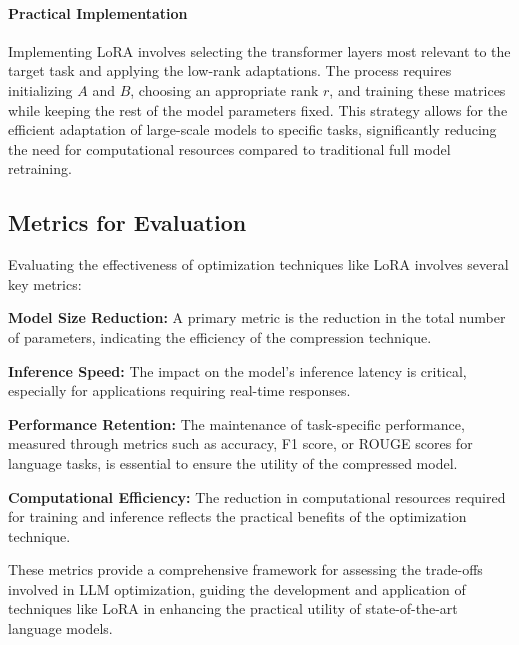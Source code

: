         \paragraph{Practical Implementation}
        Implementing LoRA involves selecting the transformer layers most relevant to the target task and applying the low-rank adaptations. The process requires initializing \(A\) and \(B\), choosing an appropriate rank \(r\), and training these matrices while keeping the rest of the model parameters fixed. This strategy allows for the efficient adaptation of large-scale models to specific tasks, significantly reducing the need for computational resources compared to traditional full model retraining.

    \subsection{Metrics for Evaluation}
        Evaluating the effectiveness of optimization techniques like LoRA involves several key metrics:
        
        \textbf{Model Size Reduction:} A primary metric is the reduction in the total number of parameters, indicating the efficiency of the compression technique.
        
        \textbf{Inference Speed:} The impact on the model's inference latency is critical, especially for applications requiring real-time responses.
        
        \textbf{Performance Retention:} The maintenance of task-specific performance, measured through metrics such as accuracy, F1 score, or ROUGE scores for language tasks, is essential to ensure the utility of the compressed model.
        
        \textbf{Computational Efficiency:} The reduction in computational resources required for training and inference reflects the practical benefits of the optimization technique.

        These metrics provide a comprehensive framework for assessing the trade-offs involved in LLM optimization, guiding the development and application of techniques like LoRA in enhancing the practical utility of state-of-the-art language models.

